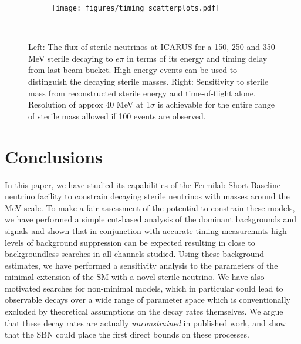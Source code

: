 \documentclass[11pt, a4paper]{article}
\begin{document}
\begin{figure}[t]
\center
\begin{subfigure}[t]{0.5\textwidth}
\texttt{[image: figures/timing\_scatterplots.pdf]}
\end{subfigure}%
~
\begin{subfigure}[t]{0.475\textwidth}
\end{subfigure}

\caption{\label{fig:tof_scatter}Left: The flux of sterile neutrinos at ICARUS for a
150, 250 and 350 MeV sterile decaying to $e \pi$ in terms of its energy and timing delay
from last beam bucket. High energy events can be used to distinguish the
decaying sterile masses. Right: Sensitivity to sterile mass from reconstructed sterile energy and time-of-flight alone. Resolution of approx 40 MeV at 1$\sigma$ is achievable for the entire range of sterile mass allowed if 100 events are observed. }

\end{figure}



\section{Conclusions}

In this paper, we have studied its capabilities of the Fermilab Short-Baseline
neutrino facility to constrain decaying sterile neutrinos with masses around
the MeV scale. To make a fair assessment of the potential to constrain these
models, we have performed a simple cut-based analysis of the dominant
backgrounds and signals and shown that in conjunction with accurate timing
measuremnts high levels of background suppression can be expected resulting in
close to backgroundless searches in all channels studied. Using these
background estimates, we have performed a sensitivity analysis to the
parameters of the minimal extension of the SM with a novel sterile neutrino.
We have also motivated searches for non-minimal models, which in
particular could lead to observable decays over a wide range of parameter space
which is conventionally excluded by theoretical assumptions on the decay rates
themselves. We argue that these decay rates are actually \emph{unconstrained}
in published work, and show that the SBN could place the first direct bounds on
these processes. 
\end{document}
